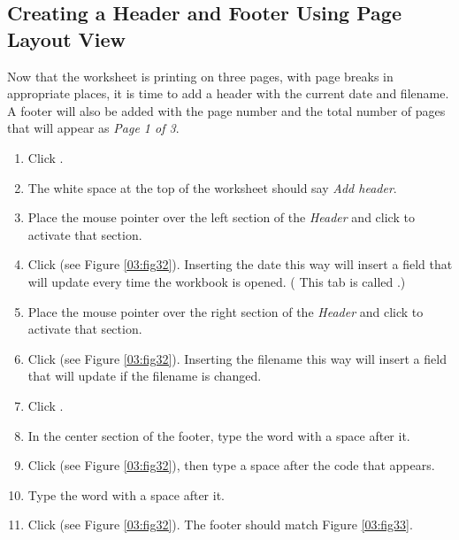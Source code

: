 \subsection{Creating a Header and Footer Using Page Layout View}

Now that the worksheet is printing on three pages, with page breaks in appropriate places, it is time to add a header with the current date and filename. A footer will also be added with the page number and the total number of pages that will appear as \textit{Page 1 of 3}. 

\begin{enumbox}
	\begin{enumerate}
		\item Click . 
		\item The white space at the top of the worksheet should say \textit{Add header}. 
		\item Place the mouse pointer over the left section of the \textit{Header} and click to activate that section.
		\item Click  (see Figure \ref{03:fig32}). Inserting the date this way will insert a field that will update every time the workbook is opened. ( This tab is called .)
		\item Place the mouse pointer over the right section of the \textit{Header} and click to activate that section.
		\item Click  (see Figure \ref{03:fig32}). Inserting the filename this way will insert a field that will update if the filename is changed.
		\item Click . 
		\item In the center section of the footer, type the word  with a space after it.
		\item Click  (see Figure \ref{03:fig32}), then type a space after the \fmtTyping{\&[Page]} code that appears.
		\item Type the word  with a space after it.
		\item Click  (see Figure \ref{03:fig32}). The footer should match Figure \ref{03:fig33}.

\end{enumerate}
\end{enumbox}
